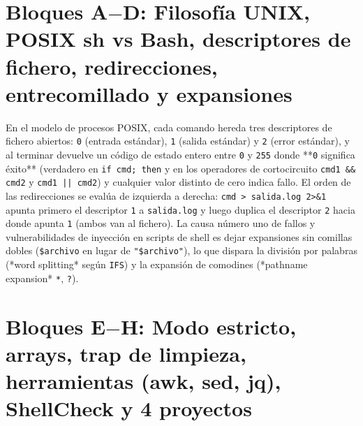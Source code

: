 \documentclass{book}
\begin{document}
\section{Bloques A\(-\)D: Filosofía UNIX, POSIX sh vs Bash, descriptores de fichero, redirecciones, entrecomillado y expansiones}

En el modelo de procesos POSIX, cada comando hereda tres descriptores de fichero abiertos: \texttt{0} (entrada estándar), \texttt{1} (salida estándar) y \texttt{2} (error estándar), y al terminar devuelve un código de estado entero entre \texttt{0} y \texttt{255} donde **\texttt{0} significa éxito** (verdadero en \texttt{if cmd; then} y en los operadores de cortocircuito \texttt{cmd1 \&\& cmd2} y \texttt{cmd1 || cmd2}) y cualquier valor distinto de cero indica fallo. El orden de las redirecciones se evalúa de izquierda a derecha: \texttt{cmd > salida.log 2>\&1} apunta primero el descriptor \texttt{1} a \texttt{salida.log} y luego duplica el descriptor \texttt{2} hacia donde apunta \texttt{1} (ambos van al fichero). La causa número uno de fallos y vulnerabilidades de inyección en scripts de shell es dejar expansiones sin comillas dobles (\texttt{\$archivo} en lugar de \texttt{"\$archivo"}), lo que dispara la división por palabras (*word splitting* según \texttt{IFS}) y la expansión de comodines (*pathname expansion* \texttt{*}, \texttt{?}).

\section{Bloques E\(-\)H: Modo estricto, arrays, trap de limpieza, herramientas (awk, sed, jq), ShellCheck y 4 proyectos}
\end{document}
